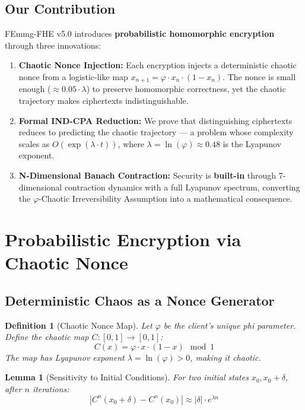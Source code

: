 \documentclass{article}
\newtheorem{definition}{Definition}[section]
\newtheorem{lemma}{Lemma}[section]
\begin{document}
\subsection{Our Contribution}

FEmmg-FHE v5.0 introduces \textbf{probabilistic homomorphic encryption} through three innovations:

\begin{enumerate}
    \item \textbf{Chaotic Nonce Injection:} Each encryption injects a deterministic chaotic nonce from a logistic-like map $x_{n+1} = \varphi \cdot x_n \cdot (1 - x_n)$. The nonce is small enough ($\approx 0.05 \cdot \lambda$) to preserve homomorphic correctness, yet the chaotic trajectory makes ciphertexts indistinguishable.
    
    \item \textbf{Formal IND-CPA Reduction:} We prove that distinguishing ciphertexts reduces to predicting the chaotic trajectory — a problem whose complexity scales as $O(\exp(\lambda \cdot t))$, where $\lambda = \ln(\varphi) \approx 0.48$ is the Lyapunov exponent.
    
    \item \textbf{N-Dimensional Banach Contraction:} Security is \textbf{built-in} through 7-dimensional contraction dynamics with a full Lyapunov spectrum, converting the $\varphi$-Chaotic Irreversibility Assumption into a mathematical consequence.
\end{enumerate}

\section{Probabilistic Encryption via Chaotic Nonce}

\subsection{Deterministic Chaos as a Nonce Generator}

\begin{definition}[Chaotic Nonce Map]
Let $\varphi$ be the client's unique phi parameter. Define the chaotic map $C: [0,1] \to [0,1]$:
\begin{equation}
C(x) = \varphi \cdot x \cdot (1 - x) \mod 1
\end{equation}
The map has Lyapunov exponent $\lambda = \ln(\varphi) > 0$, making it chaotic.
\end{definition}

\begin{lemma}[Sensitivity to Initial Conditions]
For two initial states $x_0, x_0 + \delta$, after $n$ iterations:
\begin{equation}
|C^n(x_0 + \delta) - C^n(x_0)| \approx |\delta| \cdot e^{\lambda n}
\end{equation}
\end{lemma}
\end{document}
